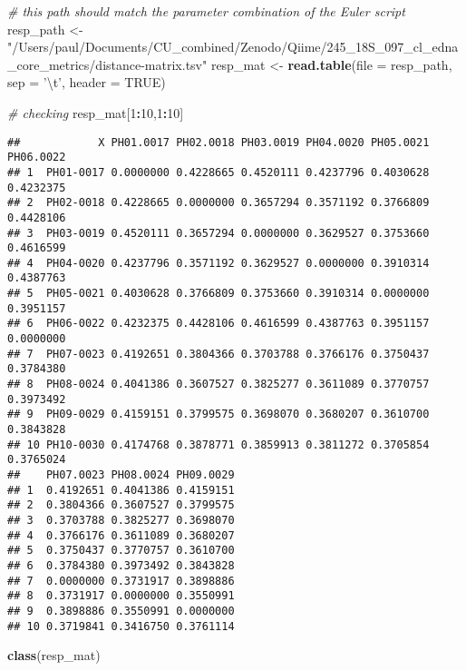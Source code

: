 \documentclass[]{article}
\newenvironment{Shaded}{\begin{snugshade}}{\end{snugshade}}
\newcommand{\KeywordTok}[1]{\textcolor[rgb]{0.13,0.29,0.53}{\textbf{#1}}}
\newcommand{\DataTypeTok}[1]{\textcolor[rgb]{0.13,0.29,0.53}{#1}}
\newcommand{\DecValTok}[1]{\textcolor[rgb]{0.00,0.00,0.81}{#1}}
\newcommand{\CharTok}[1]{\textcolor[rgb]{0.31,0.60,0.02}{#1}}
\newcommand{\StringTok}[1]{\textcolor[rgb]{0.31,0.60,0.02}{#1}}
\newcommand{\CommentTok}[1]{\textcolor[rgb]{0.56,0.35,0.01}{\textit{#1}}}
\newcommand{\OtherTok}[1]{\textcolor[rgb]{0.56,0.35,0.01}{#1}}
\newcommand{\OperatorTok}[1]{\textcolor[rgb]{0.81,0.36,0.00}{\textbf{#1}}}
\newcommand{\NormalTok}[1]{#1}
\begin{document}
\begin{Shaded}
\begin{Highlighting}[]
\CommentTok{# this path should match the parameter combination of the Euler script}
\NormalTok{resp_path <-}\StringTok{ "/Users/paul/Documents/CU_combined/Zenodo/Qiime/245_18S_097_cl_edna_core_metrics/distance-matrix.tsv"}
\NormalTok{resp_mat <-}\StringTok{ }\KeywordTok{read.table}\NormalTok{(}\DataTypeTok{file =}\NormalTok{ resp_path, }\DataTypeTok{sep =} \StringTok{'}\CharTok{\textbackslash{}t}\StringTok{'}\NormalTok{, }\DataTypeTok{header =} \OtherTok{TRUE}\NormalTok{)}

\CommentTok{# checking}
\NormalTok{resp_mat[}\DecValTok{1}\OperatorTok{:}\DecValTok{10}\NormalTok{,}\DecValTok{1}\OperatorTok{:}\DecValTok{10}\NormalTok{]}
\end{Highlighting}
\end{Shaded}

\begin{verbatim}
##            X PH01.0017 PH02.0018 PH03.0019 PH04.0020 PH05.0021 PH06.0022
## 1  PH01-0017 0.0000000 0.4228665 0.4520111 0.4237796 0.4030628 0.4232375
## 2  PH02-0018 0.4228665 0.0000000 0.3657294 0.3571192 0.3766809 0.4428106
## 3  PH03-0019 0.4520111 0.3657294 0.0000000 0.3629527 0.3753660 0.4616599
## 4  PH04-0020 0.4237796 0.3571192 0.3629527 0.0000000 0.3910314 0.4387763
## 5  PH05-0021 0.4030628 0.3766809 0.3753660 0.3910314 0.0000000 0.3951157
## 6  PH06-0022 0.4232375 0.4428106 0.4616599 0.4387763 0.3951157 0.0000000
## 7  PH07-0023 0.4192651 0.3804366 0.3703788 0.3766176 0.3750437 0.3784380
## 8  PH08-0024 0.4041386 0.3607527 0.3825277 0.3611089 0.3770757 0.3973492
## 9  PH09-0029 0.4159151 0.3799575 0.3698070 0.3680207 0.3610700 0.3843828
## 10 PH10-0030 0.4174768 0.3878771 0.3859913 0.3811272 0.3705854 0.3765024
##    PH07.0023 PH08.0024 PH09.0029
## 1  0.4192651 0.4041386 0.4159151
## 2  0.3804366 0.3607527 0.3799575
## 3  0.3703788 0.3825277 0.3698070
## 4  0.3766176 0.3611089 0.3680207
## 5  0.3750437 0.3770757 0.3610700
## 6  0.3784380 0.3973492 0.3843828
## 7  0.0000000 0.3731917 0.3898886
## 8  0.3731917 0.0000000 0.3550991
## 9  0.3898886 0.3550991 0.0000000
## 10 0.3719841 0.3416750 0.3761114
\end{verbatim}

\begin{Shaded}
\begin{Highlighting}[]
\KeywordTok{class}\NormalTok{(resp_mat)}
\end{Highlighting}
\end{Shaded}
\end{document}
